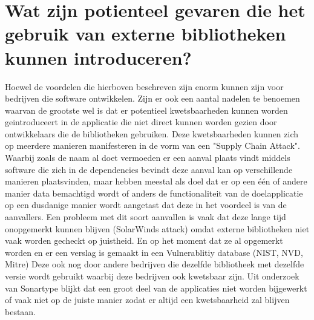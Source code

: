 \section{Wat zijn potienteel gevaren die het gebruik van externe bibliotheken kunnen introduceren?}\label{sec:wat-zijn-potienteel-gevaren-die-het-gebruik-van-externe-bibliotheken-kunnen-introduceren?}
Hoewel de voordelen die hierboven beschreven zijn enorm kunnen zijn voor bedrijven die software ontwikkelen. Zijn er ook een aantal nadelen te benoemen waarvan de grootste wel is dat er potentieel kwetsbaarheden kunnen worden geintroduceert in de applicatie die niet direct kunnen worden gezien door ontwikkelaars die de bibliotheken gebruiken. Deze kwetsbaarheden kunnen zich op meerdere manieren manifesteren in de vorm van een "Supply Chain Attack". Waarbij zoals de naam al doet vermoeden er een aanval plaats vindt middels software die zich in de dependencies bevindt deze aanval kan op verschillende manieren plaatsvinden, maar hebben meestal als doel dat er op een één of andere manier data bemachtigd wordt of anders de functionaliteit van de doelapplicatie op een dusdanige manier wordt aangetast dat deze in het voordeel is van de aanvallers. Een probleem met dit soort aanvallen is vaak dat deze lange tijd onopgemerkt kunnen blijven (SolarWinds attack) omdat externe bibliotheken niet vaak worden gecheckt op juistheid. En op het moment dat ze al opgemerkt worden en er een verslag is gemaakt in een Vulnerablitiy database (NIST, NVD, Mitre) Deze ook nog door andere bedrijven die dezelfde bibliotheek met dezelfde versie wordt gebruikt waarbij deze bedrijven ook kwetsbaar zijn. Uit onderzoek van Sonartype blijkt dat een groot deel van de applicaties niet worden bijgewerkt of vaak niet op de juiste manier zodat er altijd een kwetsbaarheid zal blijven bestaan.

